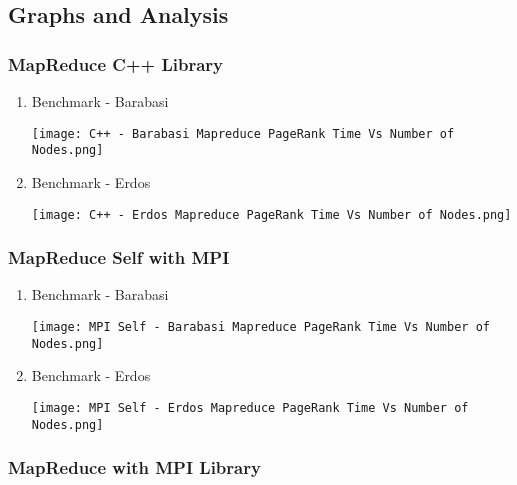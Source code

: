 \documentclass{article}
\begin{document}
    \subsection{Graphs and Analysis}
    
    \subsubsection{MapReduce C++ Library}
    \begin{enumerate}
        \item Benchmark - Barabasi
        \begin{center}
            \texttt{[image: C++ - Barabasi Mapreduce PageRank Time Vs Number of Nodes.png]}
        \end{center}
            
        
        \item Benchmark - Erdos
        \begin{center}
            \texttt{[image: C++ - Erdos Mapreduce PageRank Time Vs Number of Nodes.png]}
        \end{center}
    \end{enumerate}
    
    \clearpage
    
    \subsubsection{MapReduce Self with MPI}
    \begin{enumerate}
        \item Benchmark - Barabasi
        \begin{center}
            \texttt{[image: MPI Self - Barabasi Mapreduce PageRank Time Vs Number of Nodes.png]}
        \end{center}
            
        
        \item Benchmark - Erdos
        \begin{center}
            \texttt{[image: MPI Self - Erdos Mapreduce PageRank Time Vs Number of Nodes.png]}
        \end{center}
    \end{enumerate}
    
    \clearpage
    
    \subsubsection{MapReduce with MPI Library}
    
\end{document}
